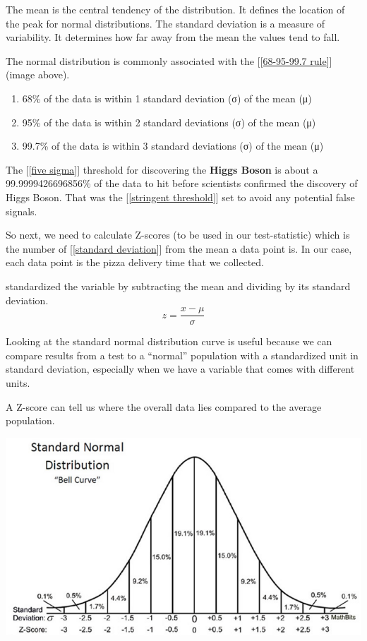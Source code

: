 \documentclass[11pt]{article}
\begin{document}
The mean is the central tendency of the distribution. It defines the location of
the peak for normal distributions. The standard deviation is a measure of
variability. It determines how far away from the mean the values tend to fall.

The normal distribution is commonly associated with the [[\href{../202101032023-68\_95\_99\_7\_rule.org}{68-95-99.7 rule}]]
(image above).
\begin{enumerate}
\item 68\% of the data is within 1 standard deviation (σ) of the mean (μ)
\item 95\% of the data is within 2 standard deviations (σ) of the mean (μ)
\item 99.7\% of the data is within 3 standard deviations (σ) of the mean (μ)
\end{enumerate}

The [[\href{../202101032041-five\_sigma.org}{five sigma}]] threshold for discovering the \textbf{Higgs Boson} is about a
99.9999426696856\% of the data to hit before scientists confirmed the discovery
of Higgs Boson. That was the [[\href{../202101032043-stringent\_threshold.org}{stringent threshold}]] set to avoid any potential
false signals.

So next, we need to calculate Z-scores (to be used in our test-statistic) which
is the number of [[\href{../202101031954-standard\_deviation.org}{standard deviation}]] from the mean a data point is. In our case,
each data point is the pizza delivery time that we collected.

standardized the variable by subtracting the mean and dividing by its standard deviation.
\[ z
  = \frac{x-\mu}{\sigma}
\]

Looking at the standard normal distribution curve is useful because we can
compare results from a test to a “normal” population with a standardized unit in
standard deviation, especially when we have a variable that comes with different
units.

A Z-score can tell us where the overall data lies compared to the average population.

\begin{center}
\includegraphics[width=.9\linewidth]{../.attach/6d/949153-db6f-4802-8248-e155309e61b9/_20210103_2124331*N1GR0w1rk3R0XZYrOUSwLQ.png}
\end{center}
\end{document}
